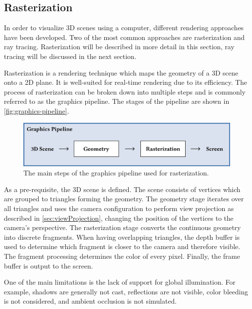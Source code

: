 \subsection{Rasterization}
\label{ch:rasterizationTheory}

In order to visualize 3D scenes using a computer, different rendering approaches have been developed. Two of the most common approaches are rasterization and ray tracing. Rasterization will be described in more detail in this section, ray tracing will be discussed in the next section.

Rasterization is a rendering technique which maps the geometry of a 3D scene onto a 2D plane. It is well-suited for real-time rendering due to its efficiency. The process of rasterization can be broken down into multiple steps and is commonly referred to as the graphics pipeline. The stages of the pipeline are shown in \autoref{fig:graphics-pipeline}.

\begin{figure}[H]
  \includegraphics[width=\columnwidth]{resources/graphics-pipeline.png}
  \caption{The main steps of the graphics pipeline used for rasterization.}
  \label{fig:graphics-pipeline}
\end{figure}

As a pre-requisite, the 3D scene is defined. The scene consists of vertices which are grouped to triangles forming the geometry. The geometry stage iterates over all triangles and uses the camera configuration to perform view projection as described in \autoref{sec:viewProjection}, changing the position of the vertices to the camera's perspective. The rasterization stage converts the continuous geometry into discrete fragments. When having overlapping triangles, the depth buffer is used to determine which fragment is closer to the camera and therefore visible. The fragment processing determines the color of every pixel. Finally, the frame buffer is output to the screen.

One of the main limitations is the lack of support for global illumination. For example, shadows are generally not cast, reflections are not visible, color bleeding is not considered, and ambient occlusion is not simulated.

